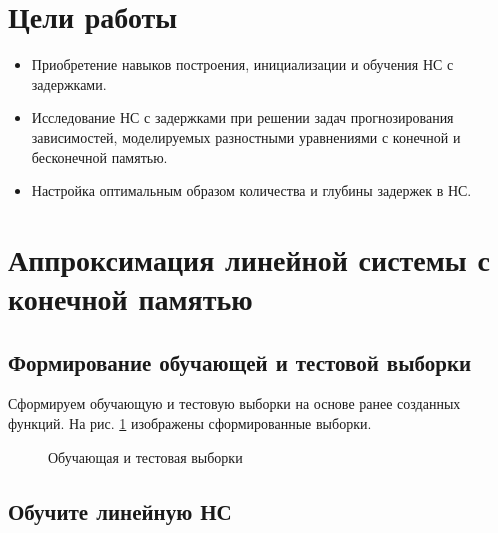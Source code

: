 





\tableofcontents
\newpage
\listoftables
\listoffigures
\newpage

\section{Цели работы}

\begin{itemize}
	\item Приобретение навыков построения, инициализации и обучения НС с задержками.
	\item Исследование НС с задержками при решении задач прогнозирования зависимостей, моделируемых разностными уравнениями с конечной и бесконечной памятью.
	\item Настройка оптимальным образом количества и глубины задержек в НС.
\end{itemize}

\section{Аппроксимация линейной системы с конечной памятью}

\subsection{Формирование обучающей и тестовой выборки}


Сформируем обучающую и тестовую выборки на основе ранее созданных функций. На рис. \ref{fig:2_1} изображены сформированные выборки. 

\begin{figure}[H]
\begin{center}
	\caption{Обучающая и тестовая выборки}
	\label{fig:2_1}
\end{center}
\end{figure}

\subsection{Обучите линейную НС}

